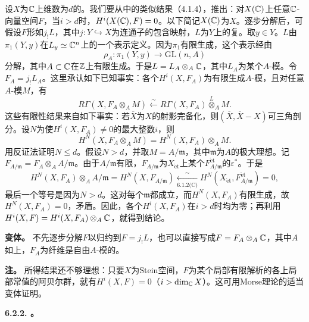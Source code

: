 设$X$为$\mathbb C$上维数为$d$的。我们要从中的类似结果（4.1.4），推出：对$X(\mathbb C)$上任意$\mathbb C$-向量空间$F$，当$i>d$时，$H^i(X(\mathbb C),F)=0$。以下简记$X(\mathbb C)$为$X$。逐步分解后，可假设$F$形如$j_!L$，其中$j:Y\hookrightarrow X$为连通子的包含映射，$L$为$Y$上的复。取$y\in Y$。$L$由$\pi_1(Y,y)$在$L_y\simeq\mathbb C^n$上的一个表示定义。因为$\pi_1$有限生成，这个表示经由
\[
\rho_A:\pi_1(Y,y)\longrightarrow\mathrm{GL}(n,A)
\]
分解，其中$A\subset\mathbb C$在$\mathbb Z$上有限生成。于是$L=L_A\otimes_A\mathbb C$，其中$L_A$为某个$A$-模。令$F_A=j_!L_A$。这里承认如下已知事实：各个$H^i(X,F_A)$为有限生成$A$-模，且对任意$A$-模$M$，有
\[
R\Gamma(X,F_A\otimes_A M)\xleftarrow{\sim}R\Gamma(X,F_A)\overset L\otimes_A M.
\]
这些有限性结果来自如下事实：若$\overline X$为$X$的射影完备化，则$(\overline X,\overline X-X)$可三角剖分。设$N$为使$H^i(X,F_A)\ne0$的最大整数$i$，则
\[
H^N(X,F_A\otimes_A M)=H^N(X,F_A)\otimes_A M.
\]
用反证法证明$N\le d$。假设$N>d$，并取$M=A/\mathfrak m$，其中$\mathfrak m$为$A$的极大理想。记$F_{A/\mathfrak m}=F_A\otimes_A A/\mathfrak m$。由于$A/\mathfrak m$有限，$F_{A/\mathfrak m}$为$X_{\mathrm{\acute et}}$上某个$F_{A/\mathfrak m}^{\mathrm{\acute et}}$的$\varepsilon^*$。于是
\[
H^N(X,F_A)\otimes_A A/\mathfrak m
=H^N(X,F_{A/\mathfrak m})
\xleftarrow[\text{6.1.2(C)}]{\sim}
H^N(X_{\mathrm{\acute et}},F_{A/\mathfrak m}^{\mathrm{\acute et}})=0,
\]
最后一个等号是因为$N>d$。这对每个$\mathfrak m$都成立，而$H^N(X,F_A)$有限生成，故$H^N(X,F_A)=0$，矛盾。因此，各个$H^i(X,F_A)$在$i>d$时均为零；再利用$H^i(X,F)=H^i(X,F_A)\otimes_A\mathbb C$，就得到结论。

\noindent\textbf{变体。} 不先逐步分解$F$以归约到$F=j_!L$，也可以直接写成$F=F_A\otimes_A\mathbb C$，其中$A$如上，$F_A$为纤维是自由$A$-模的。

\noindent\textbf{注。} 所得结果还不够理想：只要$X$为Stein空间，$F$为某个局部有限解析的各上局部常值的阿贝尔群，就有$H^i(X,F)=0$（$i>\dim_\mathbb C X$）。这可用Morse理论的适当变体证明。

\par\medskip\noindent\textbf{6.2.2. 。}

